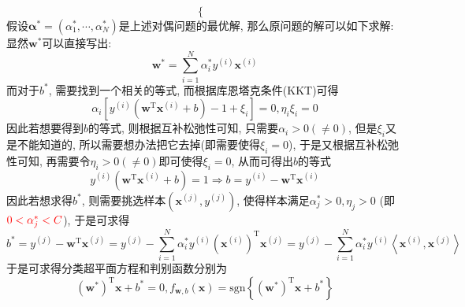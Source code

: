 \documentclass{article}
\begin{document}
\begin{homeworkProblem}
$$\begin{cases}
	\end{cases}
	$$
	假设$\boldsymbol{\alpha }^{\ast}=\left( \alpha _{1}^{\ast},\cdots ,\alpha _{N}^{*} \right)$是上述对偶问题的最优解, 那么原问题的解可以如下求解:
	显然$\boldsymbol{w}^{\ast}$可以直接写出:
	$$
	\boldsymbol{w}^{\ast}=\sum_{i=1}^N{\alpha _{i}^{\ast}y^{\left( i \right)}\boldsymbol{x}^{\left( i \right)}}
	$$
	而对于$b^{\ast}$, 需要找到一个相关的等式, 而根据库恩塔克条件(KKT)可得$$\alpha _i\left[ y^{\left( i \right)}\left( \boldsymbol{w}^{\text{T}}\boldsymbol{x}^{\left( i \right)}+b \right) -1+\xi _i \right] =0,\eta _i\xi _i=0
	$$
	因此若想要得到$b$的等式, 则根据互补松弛性可知, 只需要$\alpha_i>0(\neq 0)$, 但是$\xi_i$又是不能知道的, 所以需要想办法把它去掉(即需要使得$\xi_i=0$), 于是又根据互补松弛性可知, 再需要令$\eta_i>0(\neq 0)$即可使得$\xi_i=0$, 从而可得出$b$的等式$$y^{\left( i \right)}\left( \boldsymbol{w}^{\text{T}}\boldsymbol{x}^{\left( i \right)}+b \right) =1\Rightarrow b=y^{\left( i \right)}-\boldsymbol{w}^{\text{T}}\boldsymbol{x}^{\left( i \right)}
	$$
	因此若想求得$b^{\ast}$, 则需要挑选样本$\left(\boldsymbol{x}^{(j)},y^{(j)}\right)$, 使得样本满足$\alpha_j^{\ast}>0,\eta_j>0$ (即${\color{red} 0<\alpha_j^{\ast}<C}$), 于是可求得
	$$
	b^{\ast}=y^{\left( j \right)}-\boldsymbol{w}^{\text{T}}\boldsymbol{x}^{\left( j \right)}=y^{\left( j \right)}-\sum_{i=1}^N{\alpha _{i}^{\ast}y^{\left( i \right)}\left( \boldsymbol{x}^{\left( i \right)} \right) ^{\text{T}}\boldsymbol{x}^{\left( j \right)}}=y^{\left( j \right)}-\sum_{i=1}^N{\alpha _{i}^{\ast}y^{\left( i \right)}\left< \boldsymbol{x}^{\left( i \right)},\boldsymbol{x}^{\left( j \right)} \right>}
	$$
	于是可求得分类超平面方程和判别函数分别为$$\left( \boldsymbol{w}^{\ast} \right) ^{\text{T}}\boldsymbol{x}+b^{\ast}=0, f_{\boldsymbol{w},b}\left( \boldsymbol{x} \right) =\text{sgn} \left\{ \left( \boldsymbol{w}^{\ast} \right) ^{\text{T}}\boldsymbol{x}+b^{\ast} \right\} 
	$$
\end{homeworkProblem}


\pagebreak
\end{document}
